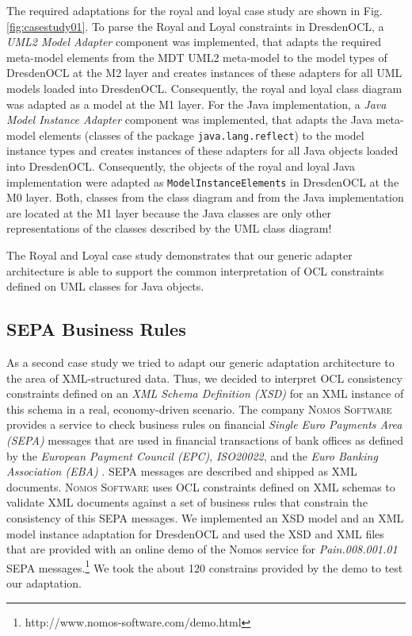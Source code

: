 The required adaptations for the royal and loyal case study are shown in Fig. \ref{fig:casestudy01}.
To parse the Royal and Loyal constraints
in DresdenOCL, a \textit{UML2 Model Adapter} component was implemented, that 
adapts the required meta-model elements from the MDT UML2 meta-model to the model 
types of DresdenOCL at the M2 layer and creates instances of these adapters for all UML models 
loaded into DresdenOCL. 
Consequently, the royal and loyal class diagram was adapted as a model at the M1 layer.
For the Java implementation, a \textit{Java Model Instance Adapter} component was implemented,
that adapts the Java meta-model elements (classes of the package \texttt{java.lang.reflect})
to the model instance types and creates instances of these adapters for all Java objects
loaded into DresdenOCL. Consequently, the objects of the royal and loyal Java implementation
were adapted as \texttt{ModelInstanceElements} in DresdenOCL at the M0 layer. Both, classes from 
the class diagram and from the Java implementation are located at the M1 layer 
because the Java classes are only other representations of the classes described by the 
UML class diagram! 

The Royal and Loyal case study demonstrates that our generic adapter architecture is able to 
support the common interpretation of OCL constraints defined on UML classes for Java objects.


\subsection{SEPA Business Rules}

As a second case study we tried to adapt our generic adaptation architecture to the
area of XML-structured data. Thus, we decided to interpret OCL consistency constraints
defined on an \textit{XML Schema Definition (XSD)} for an XML instance of this schema in a real, economy-driven
scenario. The company \textsc{Nomos Software} provides a service to check business rules on
financial \textit{Single Euro Payments Area (SEPA)} messages that are 
used in financial transactions of bank offices as defined by the \textit{European
Payment Council (EPC)}, \textit{ISO20022}, and the \textit{Euro Banking Association (EBA)} \cite{spec:UNIFI,spec:EPC}. 
SEPA messages are described and shipped as XML documents.
\textsc{Nomos Software} uses OCL constraints defined on XML schemas
to validate XML documents against a set of business rules that constrain the consistency of
this SEPA messages. We implemented an XSD model and an XML model instance adaptation 
for DresdenOCL and used the XSD and XML files that are 
provided with an online demo of the Nomos service for \textit{Pain.008.001.01} SEPA 
messages.\footnote{http://www.nomos-software.com/demo.html}
We took the about 120 constrains provided by the demo to test our adaptation. 

